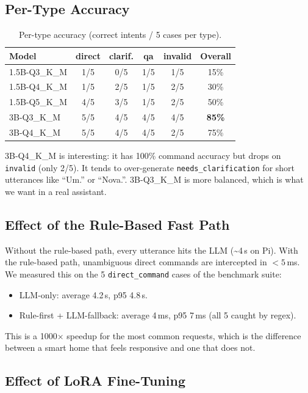 \documentclass[conference]{IEEEtran}
\begin{document}
\subsection{Per-Type Accuracy}

\begin{table}[h]
\centering
\caption{Per-type accuracy (correct intents / 5 cases per type).}
\label{tab:per-type}
\renewcommand{\arraystretch}{1.15}
\begin{tabular}{lccccc}
\toprule
\textbf{Model} & \textbf{direct} & \textbf{clarif.} & \textbf{qa} & \textbf{invalid} & \textbf{Overall} \\
\midrule
1.5B-Q3\_K\_M & 1/5 & 0/5 & 1/5 & 1/5 & 15\% \\
1.5B-Q4\_K\_M & 1/5 & 2/5 & 1/5 & 2/5 & 30\% \\
1.5B-Q5\_K\_M & 4/5 & 3/5 & 1/5 & 2/5 & 50\% \\
3B-Q3\_K\_M & 5/5 & 4/5 & 4/5 & 4/5 & \textbf{85\%} \\
3B-Q4\_K\_M & 5/5 & 4/5 & 4/5 & 2/5 & 75\% \\
\bottomrule
\end{tabular}
\end{table}

3B-Q4\_K\_M is interesting: it has 100\% command accuracy but drops on \texttt{invalid} (only 2/5). It tends to over-generate \texttt{needs\_clarification} for short utterances like ``Um.'' or ``Nova.''. 3B-Q3\_K\_M is more balanced, which is what we want in a real assistant.

\subsection{Effect of the Rule-Based Fast Path}

Without the rule-based path, every utterance hits the LLM (\textasciitilde 4\,s on Pi). With the rule-based path, unambiguous direct commands are intercepted in $<5$\,ms. We measured this on the 5 \texttt{direct\_command} cases of the benchmark suite:
\begin{itemize}
    \item LLM-only: average 4.2\,s, p95 4.8\,s.
    \item Rule-first + LLM-fallback: average 4\,ms, p95 7\,ms (all 5 caught by regex).
\end{itemize}
This is a 1000$\times$ speedup for the most common requests, which is the difference between a smart home that feels responsive and one that does not.

\subsection{Effect of LoRA Fine-Tuning}
\end{document}
